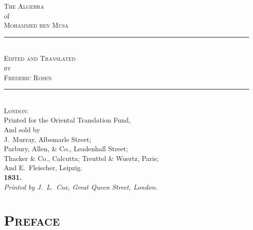 


\thispagestyle{empty}
\begin{center}
\vspace*{2cm}

{\fontsize{28}{34}\selectfont\scshape\color{titlecolor} The Algebra}\\[0.8cm]
{\fontsize{14}{18}\selectfont\color{sectioncolor} of}\\[0.8cm]
{\fontsize{28}{34}\selectfont\scshape\color{titlecolor} Mohammed ben Musa}\\[2cm]

\rule{0.5\textwidth}{1pt}\\[1cm]

{\Large\scshape Edited and Translated}\\[0.3cm]
{\Large\scshape by}\\[0.3cm]
{\Large\scshape Frederic Rosen}\\[2cm]

\rule{0.5\textwidth}{1pt}\\[1cm]

{\normalsize
\textsc{London}:\\
Printed for the Oriental Translation Fund,\\
And sold by\\
J.~Murray, Albemarle Street;\\
Parbury, Allen, \& Co., Leadenhall Street;\\
Thacker \& Co., Calcutta; Treuttel \& Wuertz, Paris;\\
And E.~Fleischer, Leipzig.\\[0.5cm]
\textbf{1831.}
}\\[1cm]

{\small\textit{Printed by J.~L.~Cox, Great Queen Street, London.}}

\vfill
\end{center}
\clearpage

\thispagestyle{empty}
\null\clearpage

\section*{\textsc{Preface}}

